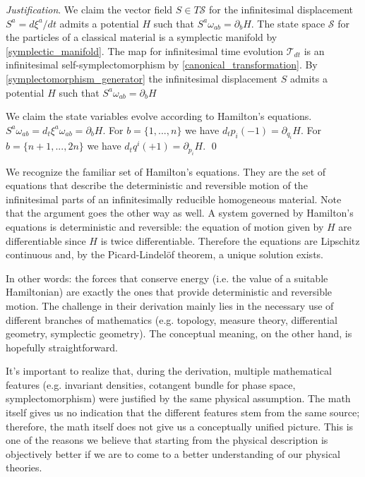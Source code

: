 \documentclass[aps,pra,10pt,twocolumn,floatfix,nofootinbib]{revtex4-1}
\numberwithin{equation}{section}
\theoremstyle{definition}
\newenvironment{justification}{\emph{Justification}.}{\qed}
\begin{document}
\begin{justification}
We claim the vector field $S \in T\mathcal{S}$ for the infinitesimal displacement $S^a = d\xi^a/dt$ admits a potential $H$ such that $S^{a} \omega_{ab} = \partial_{b}H$. The state space $\mathcal{S}$ for the particles of a classical material is a symplectic manifold by \ref{symplectic_manifold}. The map for infinitesimal time evolution $\mathcal{T}_{dt}$ is an infinitesimal self-symplectomorphism by \ref{canonical_transformation}. By \ref{symplectomorphism_generator} the infinitesimal displacement $S$ admits a potential $H$ such that $S^{a} \omega_{ab} = \partial_{b}H$

We claim the state variables evolve according to Hamilton's equations. $S^{a} \omega_{ab} = d_t\xi^a \omega_{ab} = \partial_{b}H$. For $b=\{1,...,n\}$ we have $d_tp_i (-1) = \partial_{q_i} H$. For $b=\{n+1,...,2n\}$ we have $d_tq^i (+1) = \partial_{p_i} H$.
\end{justification}

We recognize the familiar set of Hamilton's equations. They are the set of equations that describe the deterministic and reversible motion of the infinitesimal parts of an infinitesimally reducible homogeneous material. Note that the argument goes the other way as well. A system governed by Hamilton's equations is deterministic and reversible: the equation of motion given by $H$ are differentiable since $H$ is twice differentiable. Therefore the equations are Lipschitz continuous and, by the Picard-Lindel\"{o}f theorem, a unique solution exists.

In other words: the forces that conserve energy (i.e. the value of a suitable Hamiltonian) are exactly the ones that provide deterministic and reversible motion. The challenge in their derivation mainly lies in the necessary use of different branches of mathematics (e.g. topology, measure theory, differential geometry, symplectic geometry). The conceptual meaning, on the other hand, is hopefully straightforward.

It's important to realize that, during the derivation, multiple mathematical features (e.g. invariant densities, cotangent bundle for phase space, symplectomorphism) were justified by the same physical assumption. The math itself gives us no indication that the different features stem from the same source; therefore, the math itself does not give us a conceptually unified picture. This is one of the reasons we believe that starting from the physical description is objectively better if we are to come to a better understanding of our physical theories.
\end{document}
